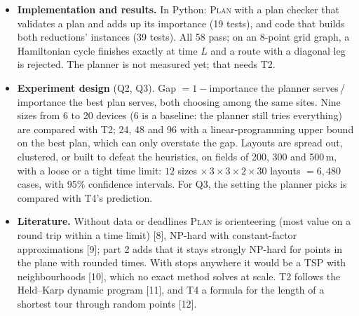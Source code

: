 \documentclass[10pt]{article}
\newcommand{\PLAN}{\textsc{Plan}}
\begin{document}
\begin{itemize}
\begin{enumerate}
        it has exactly $n$ legs, each of time $1$: a Hamiltonian cycle. Conversely such a cycle,
        flown from the dock, is a valid plan worth $n$. All numbers are at
        most $n$, so this hardness is strong.
      \item \emph{Choosing the devices alone is NP-hard: a reduction from
        knapsack} (do some items, each with a size and a value, fit a
        capacity and reach a target value? [5]). Make the dock the only site,
        with every device in reach; each item becomes a device that sends for
        the item's size and has its value as importance; $L$ is the capacity
        and $W$ the target value. The drone never flies, so valid plans are
        exactly the sets of items that fit. This hardness is only weak
        (knapsack has a pseudo-polynomial algorithm) and needs many different
        sending times. FeRRy has few: every device sends the same amount of
        data, at one of the at most 15 rates of its setting, so one stop is
        solved in polynomial time. Part 2 still works with equal data and FeRRy's three settings,
        so for FeRRy the hardness lies in the route.
    \end{enumerate}
    \emph{Easy cases:} with a single site, or at most $k$ stops for fixed
    $k$, dynamic programming solves \PLAN{} in pseudo-polynomial time [6];
    with equal sending times a single site is solved greedily [7].
  \item \textbf{Implementation and results.} In Python: \PLAN{} with a plan
    checker that validates a plan and adds up its importance (19 tests), and
    code that builds both reductions' instances (39 tests). All 58 pass; on
    an 8-point grid graph, a Hamiltonian cycle finishes exactly at time $L$
    and a route with a diagonal leg is rejected. The planner is not measured
    yet; that needs T2.
  \item \textbf{Experiment design} (Q2, Q3). Gap $=1-{}$importance the
    planner serves\,/\,importance the best plan serves, both choosing among
    the same sites. Nine sizes from 6 to 20 devices (6 is a baseline: the planner
    still tries everything) are compared with T2; 24, 48 and 96 with a
    linear-programming upper bound on the best plan, which can only overstate
    the gap. Layouts are spread out, clustered, or built to defeat the
    heuristics, on fields of 200, 300 and 500\,m, with a loose or a tight time
    limit: $12$ sizes $\times\,3\times3\times2\times30$ layouts
    $=6{,}480$ cases, with 95\% confidence intervals. For Q3, the setting the
    planner picks is compared with T4's prediction.
  \item \textbf{Literature.} Without data or deadlines \PLAN{} is
    orienteering (most value on a round trip within a time limit) [8],
    NP-hard with constant-factor approximations [9]; part 2 adds that it
    stays strongly NP-hard for points in the plane with rounded times. With
    stops anywhere it would be a TSP with neighbourhoods [10], which no exact
    method solves at scale. T2 follows the Held--Karp dynamic program [11], and T4 a formula
    for the length of a shortest tour through random points [12].
\end{itemize}
\end{document}
